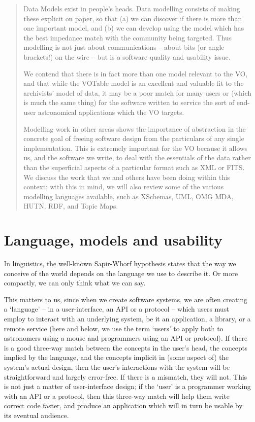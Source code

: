 \documentclass[11pt,twoside]{article}
\begin{document}
\begin{abstract}
Data Models exist in people's heads. Data modelling consists of making
these explicit on paper, so that (a) we can discover if there is more
than one important model, and (b) we can develop using the model which
has the best impedance match with the community being targeted. Thus
modelling is not just about communications -- about bits (or angle
brackets!) on the wire -- but is a software quality and usability
issue.

We contend that there is in fact more than one model relevant to the
VO, and that while the VOTable model is an excellent and valuable fit
to the archivists' model of data, it may be a poor match for many
users or (which is much the same thing) for the software written to
service the sort of end-user astronomical applications which the VO
targets.

Modelling work in other areas shows the importance of abstraction in
the concrete goal of freeing software design from the particulars of
any single implementation. This is extremely important for the VO
because it allows us, and the software we write, to deal with the
essentials of the data rather than the superficial aspects of a
particular format such as XML or FITS. We discuss the work that we and
others have been doing within this context; with this in mind, we will
also review some of the various modelling languages available, such as
XSchemas, UML, OMG MDA, HUTN, RDF, and Topic Maps.
\end{abstract}



\section{Language, models and usability}

In linguistics, the well-known Sapir-Whorf hypothesis states that the
way we conceive of the world depends on the language we use to
describe it.  Or more compactly, we can only think what we can
say.

This matters to us, since when we create software systems, we are
often creating a `language' -- in a user-interface, an API or a
protocol -- which users must employ to interact with an underlying
system, be it an application, a library, or a remote service (here and
below, we use the term `users' to apply both to astronomers using a
mouse and programmers using an API or protocol).  If there is a good
three-way match between the concepts in the user's head, the concepts
implied by the language, and the concepts implicit in (some aspect of)
the system's actual design, then the user's interactions with the
system will be straightforward and largely error-free.  If there is a
mismatch, they will not.  This is not just a matter of user-interface
design; if the `user' is a programmer working with an API or a
protocol, then this three-way match will help them write correct code
faster, and produce an application which will in turn be usable by its
eventual audience.
\end{document}
